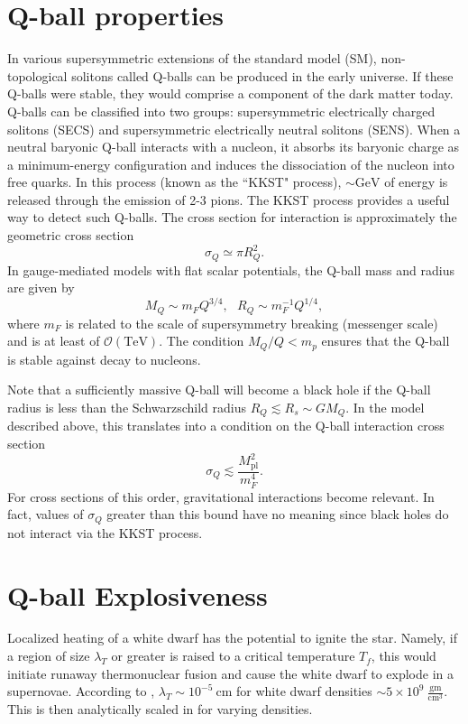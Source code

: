 \documentclass[11 pt, preprint,preprintnumbers,amsmath,amssymb, prd]{revtex4}
\newcommand{\Mpl}{M_{\text{pl}}}
\begin{document}
\section{Q-ball properties}
In various supersymmetric extensions of the standard model (SM), non-topological solitons called Q-balls can be produced in the early universe. If these Q-balls were stable, they would comprise a component of the dark matter today. Q-balls can be classified into two groups: supersymmetric electrically charged solitons (SECS) and supersymmetric electrically neutral solitons (SENS). When a neutral baryonic Q-ball interacts with a nucleon, it absorbs its baryonic charge as a minimum-energy configuration and induces the dissociation of the nucleon into free quarks. In this process (known as the ``KKST" process), $\sim \text{GeV}$ of energy is released through the emission of 2-3 pions. The KKST process provides a useful way to detect such Q-balls. The cross section for interaction is approximately the geometric cross section
\begin{equation}
\sigma_Q \simeq \pi R_Q^2.
\end{equation}
In gauge-mediated models with flat scalar potentials, the Q-ball mass and radius are given by
\begin{equation}
M_Q \sim m_F Q^{3/4}, ~~~ R_Q \sim m_F^{-1} Q^{1/4},
\end{equation}
where $m_F$ is related to the scale of supersymmetry breaking (messenger scale) and is at least of $\mathcal{O}(\text{TeV})$. The condition $M_Q/Q < m_p$ ensures that the Q-ball is stable against decay to nucleons. 

Note that a sufficiently massive Q-ball will become a black hole if the Q-ball radius is less than the Schwarzschild radius $R_Q \lesssim R_s \sim G M_Q$. In the model described above, this translates into a condition on the Q-ball interaction cross section 
\begin{equation}
\sigma_Q \lesssim \frac{\Mpl^2}{m_F^4}. 
\end{equation}
For cross sections of this order, gravitational interactions become relevant. In fact, values of $\sigma_Q$ greater than this bound have no meaning since black holes do not interact via the KKST process. 

\section{Q-ball Explosiveness}

Localized heating of a white dwarf has the potential to ignite the star. Namely, if a region of size $\lambda_T$ or greater is raised to a critical temperature $T_f$, this would initiate runaway thermonuclear fusion and cause the white dwarf to explode in a supernovae. According to \cite{Woosley}, $\lambda_T \sim 10^{-5} ~\text{cm}$ for white dwarf densities $\sim 5 \times 10^9 ~\frac{\text{gm}}{\text{cm}^3}$. This is then analytically scaled in \cite{Varela} for varying densities. 
\end{document}
